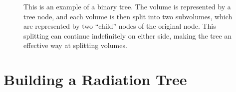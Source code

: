\begin{figure}
\begin{subfigure}[b]{0.45\textwidth}
                \label{fig:memorytree}
        \end{subfigure}
        \caption[Example of trees]{This is an example of a binary tree. The volume is represented by a tree node, and each volume is then split into two subvolumes, which are represented by two ``child'' nodes of the original node. This splitting can continue indefinitely on either side, making the tree an effective way at splitting volumes.}\label{fig:trees}
\end{figure}

\section{Building a Radiation Tree}
\label{sec:buildingtree}

